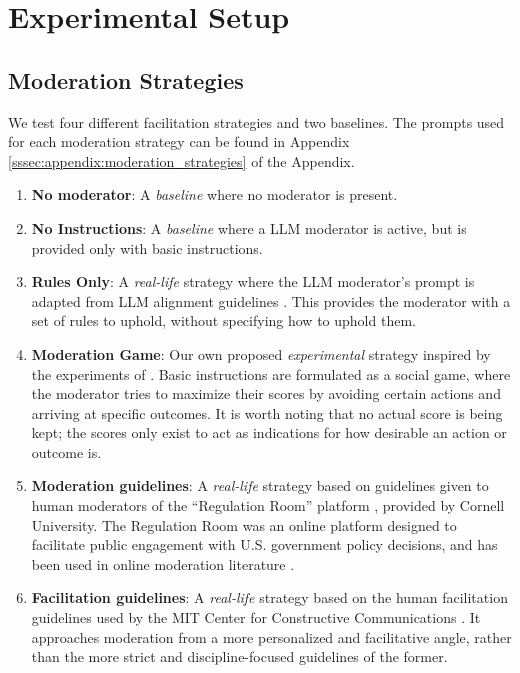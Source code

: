 \section{Experimental Setup}
\label{sec:experimental}

\subsection{Moderation Strategies}
\label{ssec:experimental:strategies}

We test four different facilitation strategies and two baselines. The prompts used for each moderation strategy can be found in Appendix \ref{sssec:appendix:moderation_strategies} of the Appendix.

\begin{enumerate}[noitemsep]
    \item \textbf{No moderator}: A \emph{baseline} where no moderator is present.

    \item \textbf{No Instructions}: A \emph{baseline} where a \ac{LLM} moderator is active, but is provided only with basic instructions.

    \item \textbf{Rules Only}: A \emph{real-life} strategy where the \ac{LLM} moderator's prompt is adapted from \ac{LLM} alignment guidelines \cite{collective_constitution}. This provides the moderator with a set of rules to uphold, without specifying how to uphold them.
    
    \item \textbf{Moderation Game}: Our own proposed \emph{experimental} strategy inspired by the experiments of \citet{abdelnabi_negotiations}. Basic instructions are formulated as a social game, where the moderator tries to maximize their scores by avoiding certain actions and arriving at specific outcomes. It is worth noting that no actual score is being kept; the scores only exist to act as indications for how desirable an action or outcome is. 

    \item \textbf{Moderation guidelines}: A \emph{real-life} strategy based on guidelines given to human moderators of the “Regulation Room” platform \citep{Cornell_eRulemaking2017}, provided by Cornell University. The Regulation Room was an online platform designed to facilitate public engagement with U.S. government policy decisions, and has been used in online moderation literature \cite{seering_self_moderation, park_et_al_2012_facilitation}.

    \item \textbf{Facilitation guidelines}: A \emph{real-life} strategy based on the human facilitation guidelines used by the MIT Center for Constructive Communications \cite{dimitra-book}. It approaches moderation from a more personalized and facilitative angle, rather than the more strict and discipline-focused guidelines of the former.
\end{enumerate}


